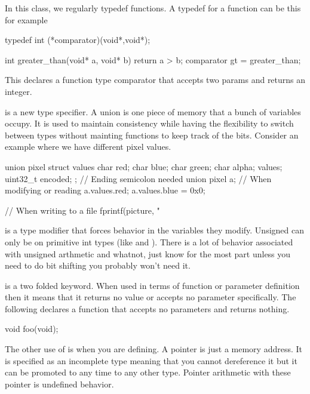 In this class, we regularly typedef functions. A typedef for a function can be this for example

\begin{code}[language=C]
typedef int (*comparator)(void*,void*);

int greater_than(void* a, void* b){
    return a > b;
}
comparator gt = greater_than;
\end{code}

This declares a function type comparator that accepts two  params and returns an integer.

\item {} is a new type specifier. A union is one piece of memory that a bunch of variables occupy. It is used to maintain consistency while having the flexibility to switch between types without mainting functions to keep track of the bits. Consider an example where we have different pixel values.
\begin{code}[language=C]
union pixel {
  struct values {
    char red;
    char blue;
    char green;
    char alpha;
  } values;
  uint32_t encoded;
}; // Ending semicolon needed
union pixel a;
// When modifying or reading
a.values.red;
a.values.blue = 0x0;

// When writing to a file
fprintf(picture, "%
\end{code}

\item {} is a type modifier that forces  behavior in the variables they modify. Unsigned can only be on primitive int types (like  and ). There is a lot of behavior associated with unsigned arthmetic and whatnot, just know for the most part unless you need to do bit shifting you probably won't need it.

\item {} is a two folded keyword. When used in terms of function or parameter definition then it means that it returns no value or accepts no parameter specifically. The following declares a function that accepts no parameters and returns nothing.

\begin{code}[language=C]
void foo(void);
\end{code}


The other use of  is when you are defining. A  pointer is just a memory address. It is specified as an incomplete type meaning that you cannot dereference it but it can be promoted to any time to any other type. Pointer arithmetic with these pointer is undefined behavior.

